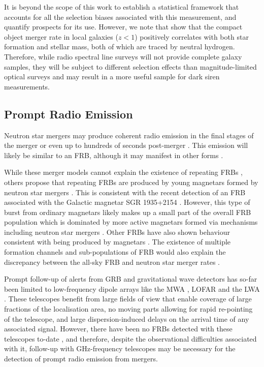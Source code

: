 It is beyond the scope of this work to establish a statistical framework that accounts for all the selection biases associated with this measurement, and quantify prospects for its use. However, we note that \citet{2020MNRAS.491.3419A} show that the compact object merger rate in local galaxies ($z<1$) positively correlates with both star formation and stellar mass, both of which are traced by neutral hydrogen. Therefore, while radio spectral line surveys will not provide complete galaxy samples, they will be subject to different selection effects than magnitude-limited optical surveys and may result in a more useful sample for dark siren measurements.

\subsection{Prompt Radio Emission}
\label{subsec:promptfollowup}
Neutron star mergers may produce coherent radio emission in the final stages of the merger \citep[e.g.][]{2013PASJ...65L..12T,2016ApJ...822L...7W} or even up to hundreds of seconds post-merger \citep[e.g.][]{2010Ap&SS.330...13P,2014ApJ...780L..21Z,2016MNRAS.461.4435M}. This emission will likely be similar to an FRB, although it may manifest in other forms \citep{1996A&A...312..937L}.

\pagebreak
While these merger models cannot explain the existence of repeating FRBs \citep{2016Natur.531..202S,2019ApJ...885L..24C,2019Natur.566..235C}, others propose that repeating FRBs are produced by young magnetars formed by neutron star mergers \citep{2018PASJ...70...39Y,2019ApJ...886..110M}. This is consistent with the recent detection of an FRB associated with the Galactic magnetar SGR 1935+2154 \citep{2020arXiv200510828B,2020arXiv200510324T}. However, this type of burst from ordinary magnetars likely makes up a small part of the overall FRB population which is dominated by more active magnetars formed via mechanisms including neutron star mergers \citep{2020arXiv200505283M}. Other FRBs have also shown behaviour consistent with being produced by magnetars \citep[e.g.][]{2016ApJ...832L...1D,2017ApJ...843L..26B,2017ApJ...841...14M,2020arXiv200204595L}. The existence of multiple formation channels and sub-populations of FRB \citep{2018NatAs...2..839C} would also explain the discrepancy between the all-sky FRB and neutron star merger rates \citep{2017AJ....154..117L,2019NatAs...3..928R}.

Prompt follow-up of alerts from GRB and gravitational wave detectors has so-far been limited to low-frequency dipole arrays like the MWA \citep{2015ApJ...814L..25K,2016PASA...33...50K}, LOFAR \citep{2019MNRAS.490.3483R} and the LWA \citep{2018ApJ...864...22A,2019ApJ...877L..39C}. These telescopes benefit from large fields of view that enable coverage of large fractions of the localisation area, no moving parts allowing for rapid re-pointing of the telescope, and large dispersion-induced delays on the arrival time of any associated signal. However, there have been no FRBs detected with these telescopes to-date \citep{2018ApJ...867L..12S,2020ApJ...896L..41C}, and therefore, despite the observational difficulties associated with it, follow-up with GHz-frequency telescopes may be necessary for the detection of prompt radio emission from mergers.

